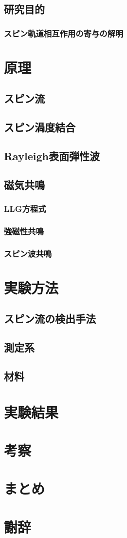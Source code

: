 \documentclass[dvipdfmx]{jsreport}
\numberwithin{equation}{chapter}
\numberwithin{table}{chapter}
\begin{document}
\section{研究目的}
\subsection{スピン軌道相互作用の寄与の解明}
\chapter{原理}
\section{スピン流}
\section{スピン渦度結合}
\section{Rayleigh表面弾性波}
\section{磁気共鳴}
\subsection{LLG方程式}
\subsection{強磁性共鳴}
\subsection{スピン波共鳴}
\chapter{実験方法}
\section{スピン流の検出手法}
\section{測定系}
\section{材料}
\chapter{実験結果}
\chapter{考察}
\chapter{まとめ}
\chapter{謝辞}
\end{document}
